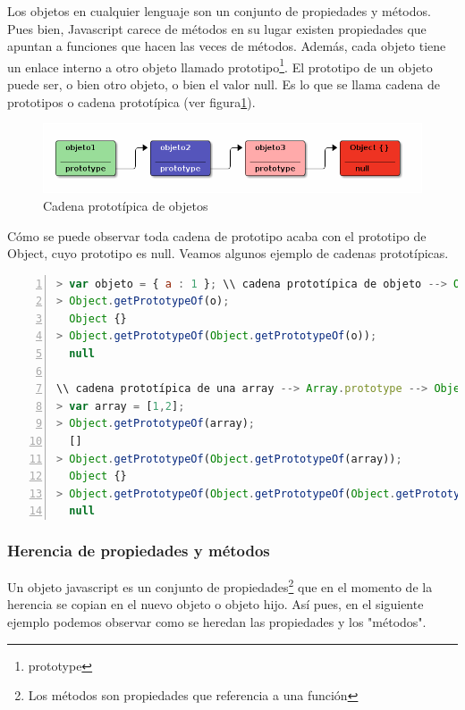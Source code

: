 Los objetos en cualquier lenguaje son un conjunto de propiedades y métodos. Pues bien, Javascript carece de métodos en su lugar existen propiedades que apuntan a funciones que hacen las veces de métodos. Además, cada objeto tiene un enlace interno a otro objeto llamado prototipo\footnote{prototype}. El prototipo de un objeto puede ser, o bien otro objeto, o bien el valor null. Es lo que se llama cadena de prototipos o cadena prototípica (ver figura\ref{fig:cadena-prototipos}). 

\begin{figure}[tbph]
\centering
\includegraphics[width=0.7\linewidth]{imagenes/prototipo1}
\caption{Cadena prototípica de objetos}
\label{fig:cadena-prototipos}
\end{figure}

Cómo se puede observar toda cadena de prototipo acaba con el prototipo de Object, cuyo prototipo es null. Veamos algunos ejemplo de cadenas prototípicas. 

\begin{lstlisting}[language=JavaScript, numbers=left]
> var objeto = { a : 1 }; \\ cadena prototípica de objeto --> Object.prototype --> null
> Object.getPrototypeOf(o); 
  Object {}
> Object.getPrototypeOf(Object.getPrototypeOf(o));
  null

\\ cadena prototípica de una array --> Array.prototype --> Object.prototype --> null
> var array = [1,2];
> Object.getPrototypeOf(array);
  []
> Object.getPrototypeOf(Object.getPrototypeOf(array));
  Object {}
> Object.getPrototypeOf(Object.getPrototypeOf(Object.getPrototypeOf(array)));
  null
\end{lstlisting}


\subsubsection{Herencia de propiedades y métodos}

Un objeto javascript es un conjunto de propiedades\footnote{Los métodos son propiedades que referencia a una función} que en el momento de la herencia se copian en el nuevo objeto o objeto hijo. Así pues, en el siguiente ejemplo podemos observar como se heredan las propiedades y los "métodos". 

